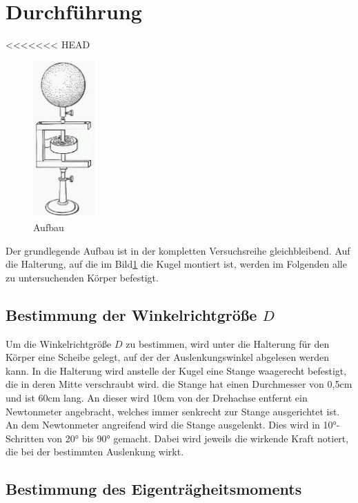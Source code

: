 \section{Durchführung}
\label{sec:Durchführung}

<<<<<<< HEAD
\begin{figure}
    \centering
    \includegraphics[height=6cm]{data/Bild_1}
    \caption{Aufbau}
    \label{fig:aufbau}
\end{figure}

Der grundlegende Aufbau ist in der kompletten Versuchsreihe gleichbleibend. Auf die Halterung, auf die im Bild\ref{fig:aufbau} die Kugel
montiert ist, werden im Folgenden alle zu untersuchenden Körper befestigt. 

\subsection{Bestimmung der Winkelrichtgröße $D$}

Um die Winkelrichtgröße $D$ zu bestimmen, wird unter die Halterung für den Körper eine Scheibe gelegt, auf der der Auslenkungswinkel 
abgelesen werden kann. In die Halterung wird anstelle der Kugel eine Stange waagerecht befestigt, die in deren Mitte verschraubt wird.
die Stange hat einen Durchmesser von 0,5$\si{\centi\meter}$ und ist 60$\si{\centi\meter}$ lang. An dieser wird 10$\si{\centi\meter}$
von der Drehachse entfernt ein Newtonmeter angebracht, welches immer senkrecht zur Stange ausgerichtet ist. An dem Newtonmeter 
angreifend wird die Stange ausgelenkt. Dies wird in 10$\si{\degree}$-Schritten von 20$\si{\degree}$ bis 90$\si{\degree}$ gemacht.
Dabei wird jeweils die wirkende Kraft notiert, die bei der bestimmten Auslenkung wirkt. 

\subsection{Bestimmung des Eigenträgheitsmoments}

